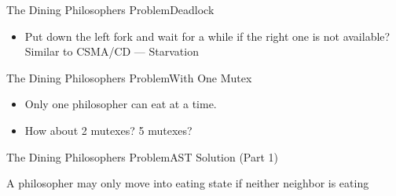 \begin{frame}{The Dining Philosophers Problem}{Deadlock}
  \begin{center}
  \end{center}
  \begin{itemize}
  \item Put down the left fork and wait for a while if the right one is not available?
    Similar to CSMA/CD --- Starvation
  \end{itemize}
\end{frame}

\begin{frame}{The Dining Philosophers Problem}{With One Mutex}
  \begin{minipage}{.49\linewidth}
    \begin{center}
    \end{center}
  \end{minipage} \hfill
  \begin{minipage}{.49\linewidth}
    \begin{center}
    \end{center}
  \end{minipage}
  \pause
  \begin{itemize}
  \item Only one philosopher can eat at a time.
  \item How about 2 mutexes? 5 mutexes?
  \end{itemize}
\end{frame}

\begin{frame}{The Dining Philosophers Problem}{AST Solution (Part 1)}
\begin{block}{A philosopher may only move into eating state if neither neighbor is
    eating}
  \begin{center}
  \end{center}
\end{block}
\end{frame}


